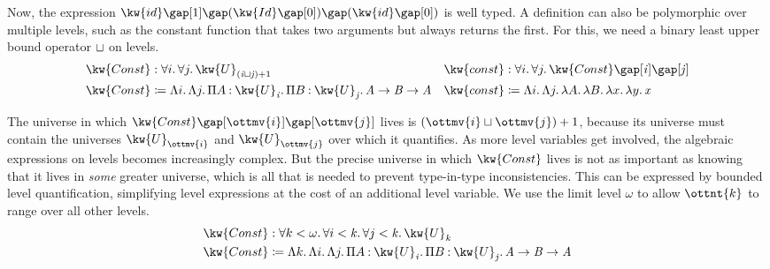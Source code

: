 \documentclass[a4paper,UKenglish,cleveref,autoref,thm-restate]{lipics-v2021}
\begin{document}
Now, the expression $    \kw{ id }   \gap [   1   ]   \gap   (   \kw{ Id }   \gap [   0   ]  )    \gap   (   \kw{ id }   \gap [   0   ]  )  $ is well typed.
A definition can also be polymorphic over multiple levels,
such as the constant function that takes two arguments but always returns the first.
For this, we need a binary least upper bound operator $  \relax   \sqcup   \relax  $ on levels.
%
\begin{align*}
   \kw{ Const }  &:  \forall  i  \mathpunct{.}   \forall  j  \mathpunct{.}   \kw{U}_{    (   \mathit{ i }   \sqcup   \mathit{ j }   )   + 1   }   
  & \kw{ const }  &:    \forall  i  \mathpunct{.}   \forall  j  \mathpunct{.}   \kw{ Const }     \gap [   \mathit{ i }   ]   \gap [   \mathit{ j }   ]  \\
   \kw{ Const }  &\coloneqq    \Lambda  i  \mathpunct{.}   \Lambda  j  \mathpunct{.}   \Pi  A  \mathbin{:}   \kw{U}_{  \mathit{ i }  }   \mathpunct{.}   \Pi  B  \mathbin{:}   \kw{U}_{  \mathit{ j }  }   \mathpunct{.}   \mathit{ A }       \to   \mathit{ B }    \to   \mathit{ A }  
  & \kw{ const }  &\coloneqq  \Lambda  i  \mathpunct{.}   \Lambda  j  \mathpunct{.}   \lambda  A  \mathpunct{.}   \lambda  B  \mathpunct{.}   \lambda  x  \mathpunct{.}   \lambda  y  \mathpunct{.}   \mathit{ x }       
\end{align*}

The universe in which $   \kw{ Const }   \gap [   \ottmv{i}   ]   \gap [   \ottmv{j}   ] $ lives is $  (   \ottmv{i}   \sqcup   \ottmv{j}   )   + 1 $,
because its universe must contain the universes
$ \kw{U}_{  \ottmv{i}  } $ and $ \kw{U}_{  \ottmv{j}  } $ over which it quantifies.
As more level variables get involved,
the algebraic expressions on levels becomes increasingly complex.
But the precise universe in which $ \kw{ Const } $ lives is not as important
as knowing that it lives in \emph{some} greater universe,
which is all that is needed to prevent type-in-type inconsistencies.
This can be expressed by bounded level quantification,
simplifying level expressions at the cost of an additional level variable.
We use the limit level $ \omega $ to allow $\ottnt{k}$ to range over all other levels.
%
\begin{align*}
   \kw{ Const }  &:  \forall  k  <   \omega   \mathpunct{.}   \forall  i  <   \mathit{ k }   \mathpunct{.}   \forall  j  <   \mathit{ k }   \mathpunct{.}   \kw{U}_{  \mathit{ k }  }     \\
   \kw{ Const }  &\coloneqq    \Lambda  k  \mathpunct{.}   \Lambda  i  \mathpunct{.}   \Lambda  j  \mathpunct{.}   \Pi  A  \mathbin{:}   \kw{U}_{  \mathit{ i }  }   \mathpunct{.}   \Pi  B  \mathbin{:}   \kw{U}_{  \mathit{ j }  }   \mathpunct{.}   \mathit{ A }        \to   \mathit{ B }    \to   \mathit{ A }  
\end{align*}
\end{document}
